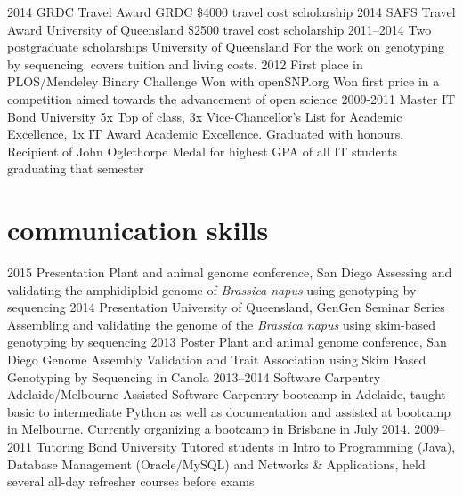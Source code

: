 \documentclass[]{friggeri-cv} %
\begin{document}
\begin{entrylist}
\entry
{2014}
{GRDC Travel Award}
{GRDC}
{\$4000 travel cost scholarship}
\entry
{2014}
{SAFS Travel Award}
{University of Queensland}
{\$2500 travel cost scholarship}
\entry
{2011--2014}
{Two postgraduate scholarships}
{University of Queensland}
{For the work on genotyping by sequencing, covers tuition and living costs.}
\entry
{2012}
{First place in PLOS/Mendeley Binary Challenge}
{Won with openSNP.org}
{Won first price in a competition aimed towards the advancement of open science}
\entry
{2009-2011}
{Master IT}
{Bond University}
{5x Top of class,  3x Vice-Chancellor's List for Academic Excellence, 1x IT Award Academic Excellence. Graduated with honours. Recipient of John Oglethorpe Medal for highest GPA of all IT students graduating that semester}
\end{entrylist}


\newpage
\section{communication skills}

\begin{entrylist}
\entry
{2015}
{Presentation}
{Plant and animal genome conference, San Diego}
{Assessing and validating the amphidiploid genome of \textit{Brassica napus} using genotyping by sequencing}
\entry
{2014}
{Presentation}
{University of Queensland, GenGen Seminar Series}
{Assembling and validating the genome of the \textit{Brassica napus} using skim-based genotyping by sequencing}
\entry
{2013}
{Poster}
{Plant and animal genome conference, San Diego}
{Genome Assembly Validation and Trait Association using Skim Based Genotyping by Sequencing in Canola}
\entry
{2013--2014}
{Software Carpentry}
{Adelaide/Melbourne}
{Assisted Software Carpentry bootcamp in Adelaide, taught basic to intermediate Python as well as documentation and assisted at bootcamp in Melbourne. Currently organizing a bootcamp in Brisbane in July 2014.}
\entry
{2009--2011}
{Tutoring}
{Bond University}
{Tutored students in Intro to Programming (Java), Database Management (Oracle/MySQL) and Networks \& Applications, held several all-day refresher courses before exams}
\end{entrylist}
\end{document}
